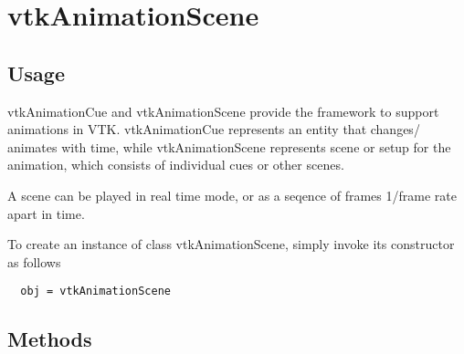 \section{vtkAnimationScene}

\subsection{Usage}

 vtkAnimationCue and vtkAnimationScene provide the framework to support
 animations in VTK. vtkAnimationCue represents an entity that changes/
 animates with time, while vtkAnimationScene represents scene or setup 
 for the animation, which consists of individual cues or other scenes.

 A scene can be played in real time mode, or as a seqence of frames
 1/frame rate apart in time.

To create an instance of class vtkAnimationScene, simply
invoke its constructor as follows
\begin{verbatim}
  obj = vtkAnimationScene
\end{verbatim}
\subsection{Methods}

